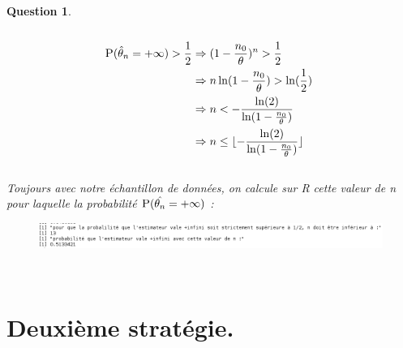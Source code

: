 \documentclass[a4paper,11pt]{article}
\newtheorem{exo1}{Question}
\begin{document}
\begin{exo1} \ \\ \\
\begin{equation}
\begin{aligned}
\textsc{P}(\hat{\theta}_{n}=+\infty) > \frac{1}{2} & \Rightarrow (1-\frac{n_{0}}{\theta})^{n} > \frac{1}{2} \ \\
& \Rightarrow n\ln(1-\frac{n_{0}}{\theta}) > \ln(\frac{1}{2}) \ \\
& \Rightarrow n < -\frac{\ln(2)}{\ln(1-\frac{n_{0}}{\theta})} \ \\
& \Rightarrow n \leq \lfloor-\frac{\ln(2)}{\ln(1-\frac{n_{0}}{\theta})}\rfloor
\end{aligned}
\end{equation} \ \\
Toujours avec notre échantillon de données, on calcule sur R cette valeur de n pour laquelle la probabilité $\textsc{P}(\hat{\theta_{n}}=+\infty)$ :
\begin{figure}[h]
\includegraphics[scale=0.5]{images/Q1_6.png}
\end{figure} \ \\
\end{exo1}

\newpage

\section{Deuxième stratégie.}
\end{document}
